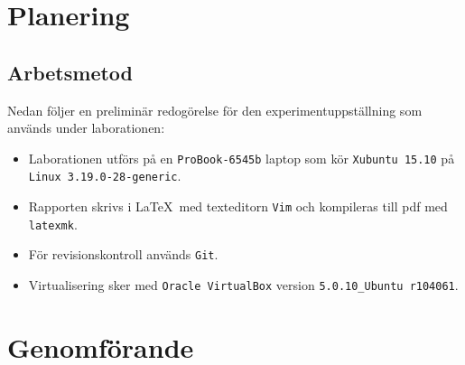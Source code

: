 %

\section{Planering}


\subsection{Arbetsmetod}

Nedan följer en preliminär redogörelse för den experimentuppställning som används
under laborationen:

\begin{itemize}
  \item Laborationen utförs på en \texttt{ProBook-6545b} laptop som kör
        \texttt{Xubuntu 15.10} på \texttt{Linux 3.19.0-28-generic}.

  \item Rapporten skrivs i \LaTeX\ med texteditorn \texttt{Vim} och kompileras
        till pdf med \texttt{latexmk}.

  \item För revisionskontroll används \texttt{Git}.

  \item Virtualisering sker med \texttt{Oracle VirtualBox} version
        \texttt{5.0.10\_Ubuntu r104061}.

\end{itemize}


\section{Genomförande}


